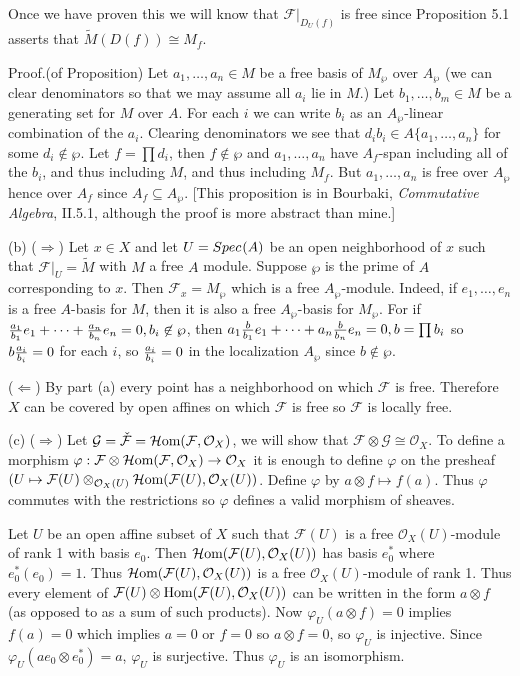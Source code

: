 \documentclass[12pt]{article}
\newcommand{\sox}{\mathcal{O}_X}
\renewcommand{\sf}{\mathcal{F}}
\newcommand{\sg}{\mathcal{G}}
\newcommand{\shom}{\mathcal{H}\mbox{\rm om}}
\renewcommand{\hom}{\mbox{\rm Hom}}
\newcommand{\tensor}{\otimes}
\newcommand{\tens}{\otimes}
\newcommand{\isom}{\cong}
\newcommand{\ru}{|_U}
\renewcommand{\phi}{\varphi}
\newcommand{\spec}{Spec \hspace{.01in}}
\newcommand{\proof}{\mbox{\sc Proof.\hspace{.1in}}}
\begin{document}
Once we have proven this we will know that $\sf|_{D_U(f)}$
is free since Proposition 5.1 asserts that 
$\tilde{M}(D(f))\cong M_f$.  

\proof (of Proposition) Let $a_1,\ldots,a_n\in M$ be a free
basis of $M_{\wp}$ over $A_{\wp}$ (we can clear denominators
so that we may assume all $a_i$ lie in $M$.) Let
$b_1,\ldots,b_m\in M$ be a generating set for $M$
over $A$. For each $i$ we can write $b_i$ as
an $A_{\wp}$-linear combination of the $a_i$. Clearing
denominators we see that $d_i b_i\in A\{a_1,\ldots,a_n\}$
for some $d_i\not\in\wp$. Let $f=\prod d_i$, then 
$f\not\in\wp$ and $a_1,\ldots,a_n$ have 
$A_f$-span including all of the $b_i$,  and thus
including $M$, and thus including $M_f$. But
$a_1,\ldots,a_n$ is free over $A_{\wp}$ hence over
$A_f$ since $A_f\subseteq A_{\wp}$. [This proposition 
is in Bourbaki, {\em Commutative Algebra},
II.5.1, although the proof is more abstract 
than mine.] 

(b) ($\Longrightarrow$) Let $x\in X$ and let $U=\spec(A)$ be an open
neighborhood of $x$ such that $\sf\ru=\tilde{M}$
with $M$ a free $A$ module. Suppose $\wp$ is the
prime of $A$ corresponding to $x$. Then $\sf_x=M_\wp$
which is a free $A_{\wp}$-module. Indeed,
if $e_1,\ldots,e_n$ is a free $A$-basis for $M$,
then it is also a free $A_{\wp}$-basis for
$M_{\wp}$. For if 
${a_1\over b_1}e_1 + \cdots + {a_n\over b_n}e_n=0, 
b_i\not\in \wp$,
then 
$a_1{b\over b_1}e_1+\cdots+a_n{b\over b_n}e_n=0, b=\prod b_i$
so $b{a_i\over b_i}=0$ for each $i$,
so ${a_i\over b_i}=0$ in the localization $A_{\wp}$ 
since $b\not\in\wp$.  

($\Longleftarrow$) By part (a) every point has a neighborhood
on which $\sf$ is free. Therefore $X$ can be covered by 
open affines on which $\sf$ is free so $\sf$ is locally free. 

(c) ($\Longrightarrow$)
Let $\sg=\check{\sf}=\shom(\sf,\sox)$, we will show that 
$\sf\tensor\sg\isom\sox$. To define a morphism
$\phi:\sf\tensor\shom(\sf,\sox)\rightarrow\sox$  
it is enough to define $\phi$ on the presheaf
$(U\mapsto \sf(U)\tensor_{\sox(U)}\shom(\sf(U),\sox(U))$.
Define $\phi$ by $a\tens f\mapsto f(a)$. Thus $\phi$ commutes
with the restrictions so $\phi$ defines a valid morphism
of sheaves. 

Let $U$ be an open affine subset of $X$ such that $\sf(U)$
is a free $\sox(U)$-module of rank 1 with basis $e_0$. 
Then $\shom(\sf(U),\sox(U))$ has basis $e_0^{*}$ where
$e_0^{*}(e_0)=1$. Thus $\shom(\sf(U),\sox(U))$ is a free
$\sox(U)$-module of rank 1. Thus every element of
$\sf(U)\tensor \hom(\sf(U),\sox(U))$ can be written in the
form $a\tens f$ (as opposed to as a sum of such products). 
Now $\phi_U(a\tens f)=0$ implies $f(a)=0$ which implies
$a=0$ or $f=0$ so $a\tens f=0$, so $\phi_U$ is injective.
Since $\phi_U(ae_0\tens e_0^{*})=a$, $\phi_U$ is surjective.
Thus $\phi_U$ is an isomorphism.
\end{document}
